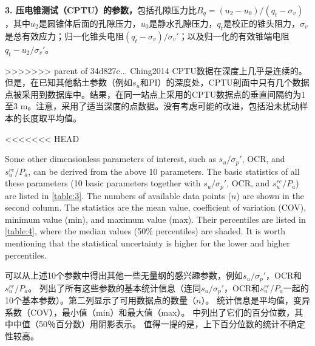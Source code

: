 \begin{paracol}{2}
\begin{enumerate}
        \textbf{3. 压电锥测试（CPTU）的参数，}包括孔隙压力比$B_q=(u_2-u_0)/(q_t-\sigma_v)$，其中$u_2$是圆锥体后面的孔隙压力，$u_0$是静水孔隙压力，$q_t$是校正的锥头阻力，$\sigma_v$是总有效应力；归一化锥头电阻$(q_t-\sigma_v)/\sigma_v'$；以及归一化的有效锥端电阻$q_t-u_2/\sigma_v'$。\par
>>>>>>> parent of 34d827c... Ching2014
        CPTU数据在深度上几乎是连续的。但是，在已知其他黏土参数（例如$s_u$和PI）的深度处，CPTU剖面中只有几个数据点被采用到数据库中。结果，在同一站点上采用的CPTU数据点的垂直间隔约为1至3 m。注意，采用了适当深度的点数据。没有考虑可能的改进，包括沿未扰动样本的长度取平均值。
    \end{enumerate}

    
<<<<<<< HEAD
    \switchcolumn*
    
    Some other dimensionless parameters of interest, such as $s_u/\sigma_p'$, OCR, and $s_u^{re}/P_a$, can be derived from the above 10 parameters. The basic statistics of all these parameters (10 basic parameters together with $s_u/\sigma_p'$, OCR, and $s_u^{re}/P_a$) are listed in \autoref{table:3}. The numbers of available data points ($n$) are shown in the second column. The statistics are the mean value, coefficient of variation (COV), minimum value (min), and maximum value (max). Their percentiles are listed in \autoref{table:4}, where the median values (50$\%$ percentiles) are shaded. It is worth mentioning that the statistical uncertainty is higher for the lower and higher percentiles.
    
    \switchcolumn
    
    可以从上述10个参数中得出其他一些无量纲的感兴趣参数，例如$s_u/\sigma_p'$，OCR和$s_u^{re}/P_a$。 列出了所有这些参数的基本统计信息（连同$s_u/\sigma_p'$，OCR和$s_u^{re}/P_a$一起的10个基本参数）。第二列显示了可用数据点的数量（$n$）。 统计信息是平均值，变异系数（COV），最小值（min）和最大值（max）。 中列出了它们的百分位数，其中中值（50％百分数）用阴影表示。 值得一提的是，上下百分位数的统计不确定性较高。
        

\end{paracol}
